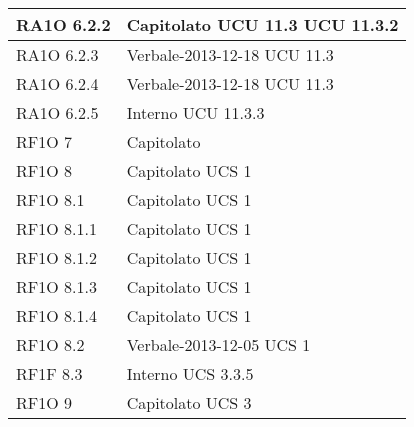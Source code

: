 \begin{center}
\begin{longtable}{ | p{5cm} | p{5cm} |}
				RA1O 6.2.2 &  Capitolato \newline  UCU 11.3 \newline  UCU 11.3.2 \newline  \\ \hline      
				RA1O 6.2.3 &  Verbale-2013-12-18 \newline  UCU 11.3 \newline  \\ \hline      
				RA1O 6.2.4 &  Verbale-2013-12-18 \newline  UCU 11.3 \newline  \\ \hline      
				RA1O 6.2.5 &  Interno \newline  UCU 11.3.3 \newline  \\ \hline      
				RF1O 7 &  Capitolato \newline  \\ \hline      
				RF1O 8 &  Capitolato \newline  UCS 1 \newline  \\ \hline      
				RF1O 8.1  &  Capitolato \newline  UCS 1 \newline  \\ \hline      
				RF1O 8.1.1 &  Capitolato \newline  UCS 1 \newline  \\ \hline      
				RF1O 8.1.2 &  Capitolato \newline  UCS 1 \newline  \\ \hline      
				RF1O 8.1.3 &  Capitolato \newline  UCS 1 \newline  \\ \hline      
				RF1O 8.1.4 &  Capitolato \newline  UCS 1 \newline  \\ \hline      
				RF1O 8.2 &  Verbale-2013-12-05 \newline  UCS 1 \newline  \\ \hline      
				RF1F 8.3 &  Interno \newline  UCS 3.3.5 \newline  \\ \hline      
				RF1O 9 &  Capitolato \newline  UCS 3 \newline  \\ \hline      

\end{longtable}
\end{center}

